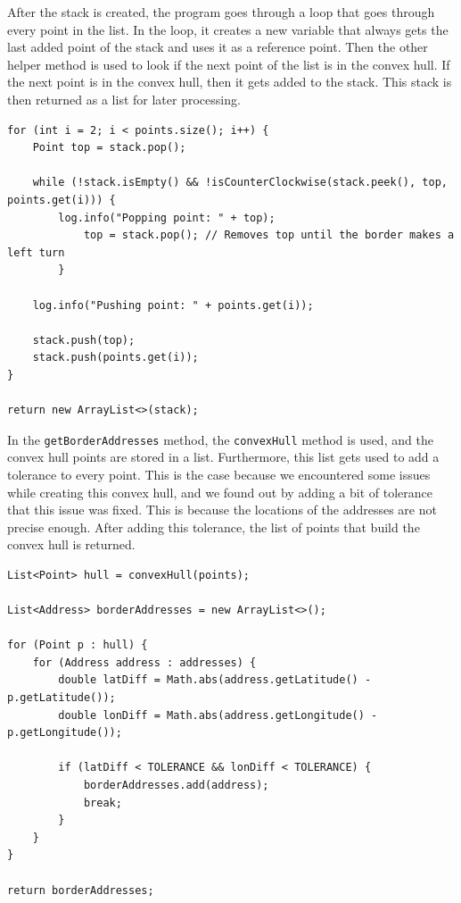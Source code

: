     After the stack is created, the program goes through a loop that goes through every point in the list. In the loop, it creates a new variable that always gets the last added point of the stack and uses it as a reference point. Then the other helper method is used to look if the next point of the list is in the convex hull. If the next point is in the convex hull, then it gets added to the stack. This stack is then returned as a list for later processing.
    \lstset{style=mycsharp, caption=Convex Hull Calculation}
    \begin{lstlisting}
for (int i = 2; i < points.size(); i++) {
    Point top = stack.pop();

    while (!stack.isEmpty() && !isCounterClockwise(stack.peek(), top, points.get(i))) {
        log.info("Popping point: " + top);
            top = stack.pop(); // Removes top until the border makes a left turn
        }

    log.info("Pushing point: " + points.get(i));

    stack.push(top);
    stack.push(points.get(i));
}

return new ArrayList<>(stack);
    \end{lstlisting}

    In the \texttt{getBorderAddresses} method, the \texttt{convexHull} method is used, and the convex hull points are stored in a list. Furthermore, this list gets used to add a tolerance to every point. This is the case because we encountered some issues while creating this convex hull, and we found out by adding a bit of tolerance that this issue was fixed. This is because the locations of the addresses are not precise enough. After adding this tolerance, the list of points that build the convex hull is returned.
    \lstset{style=mycsharp, caption=Lowest Point Calculation}
    \begin{lstlisting}
List<Point> hull = convexHull(points);

List<Address> borderAddresses = new ArrayList<>();
        
for (Point p : hull) {
    for (Address address : addresses) {
        double latDiff = Math.abs(address.getLatitude() - p.getLatitude());
        double lonDiff = Math.abs(address.getLongitude() - p.getLongitude());
        
        if (latDiff < TOLERANCE && lonDiff < TOLERANCE) {
            borderAddresses.add(address);
            break;
        }
    }
}
        
return borderAddresses;
    \end{lstlisting}

